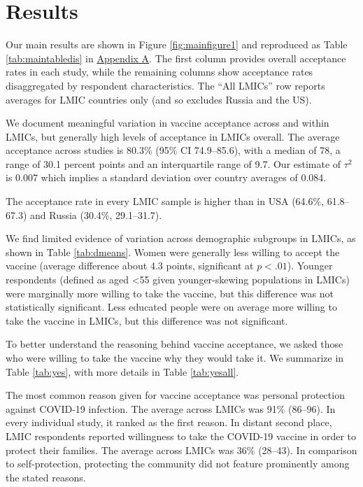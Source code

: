 \documentclass[
  12pt,
]{article}
\begin{document}
\hypertarget{results}{%
\section*{Results}\label{results}}

Our main results are shown in Figure \ref{fig:mainfigure1} and reproduced as Table \ref{tab:maintabledis} in \protect\hyperlink{appendixd}{Appendix A}. The first column provides overall acceptance rates in each study, while the remaining columns show acceptance rates disaggregated by respondent characteristics. The ``All LMICs'' row reports averages for LMIC countries only (and so excludes Russia and the US).

We document meaningful variation in vaccine acceptance across and within LMICs, but generally high levels of acceptance in LMICs overall. The average acceptance across studies is 80.3\% (95\% CI 74.9--85.6), with a median of 78, a range of 30.1 percent points and an interquartile range of 9.7. Our estimate of \(\tau^2\) is 0.007 which implies a standard deviation over country averages of 0.084.

The acceptance rate in every LMIC sample is higher than in USA (64.6\%, 61.8--67.3) and Russia (30.4\%, 29.1--31.7).

We find limited evidence of variation across demographic subgroups in LMICs, as shown in Table \ref{tab:dmeans}. Women were generally less willing to accept the vaccine (average difference about 4.3 points, significant at \(p<.01\)). Younger respondents (defined as aged \textless55 given younger-skewing populations in LMICs) were marginally more willing to take the vaccine, but this difference was not statistically significant. Less educated people were on average more willing to take the vaccine in LMICs, but this difference was not significant.

To better understand the reasoning behind vaccine acceptance, we asked those who were willing to take the vaccine why they would take it. We summarize in Table \ref{tab:yes}, with more details in Table \ref{tab:yesall}.

The most common reason given for vaccine acceptance was personal protection against COVID-19 infection. The average across LMICs was 91\% (86--96). In every individual study, it ranked as the first reason. In distant second place, LMIC respondents reported willingness to take the COVID-19 vaccine in order to protect their families. The average across LMICs was 36\% (28--43). In comparison to self-protection, protecting the community did not feature prominently among the stated reasons.
\end{document}
